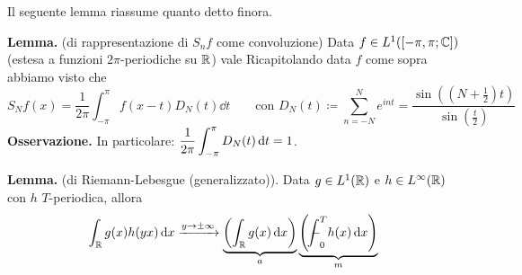 %
%



Il seguente lemma riassume quanto detto finora.

\textbf{Lemma.} (di rappresentazione di $S_n f$ come convoluzione)
Data $f \in L^1([-\pi,\pi;\mathbb C])$ (estesa a funzioni $2\pi$-periodiche su $\mathbb R$) vale
Ricapitolando data $f$ come sopra abbiamo visto che
$$
	S_N f(x) = \frac{1}{2\pi} \int_{-\pi}^\pi f(x - t) D_N(t) \dd t
\qquad
\text{con }
D_N(t) \coloneqq \sum_{n=-N}^N e^{int} = \frac{\sin\left(\left(N + \frac{1}{2}\right)t\right)}{\sin \left(\frac{t}{2}\right)}
$$
\textbf{Osservazione.}
In particolare: $\displaystyle \frac{1}{2\pi} \int_{-\pi}^\pi D_N(t) \,\mathrm{d} t = 1$.

\textbf{Lemma.} (di Riemann-Lebesgue (generalizzato)).
Data $g \in L^1(\mathbb R)$ e $h \in L^\infty(\mathbb R)$ con $h$ $T$-periodica, allora
$$
\int_\R g(x) h(yx) \dd x \xrightarrow{y \to \pm \infty}
\underbrace{\left(\int_\R g(x) \dd x \right)}_a
\underbrace{\left(\avint_0^T h(x) \dd x \right)}_m
$$


